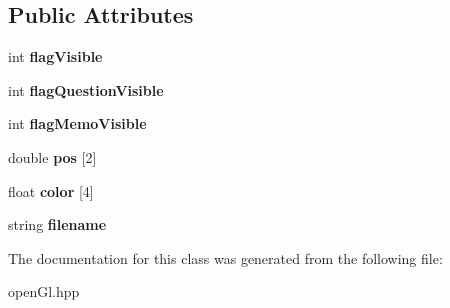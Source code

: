 \subsection*{Public Attributes}
\begin{DoxyCompactItemize}
\item 
\mbox{\label{classtableBergson_adaec1cc9fa66934fb753b73cf1cea6c8}} 
int {\bfseries flag\+Visible}
\item 
\mbox{\label{classtableBergson_a3de79075c33d5fdfada9f9d1ea7b42f7}} 
int {\bfseries flag\+Question\+Visible}
\item 
\mbox{\label{classtableBergson_afd6b8a993aceba9061b8acd499ee0c19}} 
int {\bfseries flag\+Memo\+Visible}
\item 
\mbox{\label{classtableBergson_ab0415c47c341dcaf315cc3d9c910304f}} 
double {\bfseries pos} \mbox{[}2\mbox{]}
\item 
\mbox{\label{classtableBergson_a855fb30d561c14e0043b82eb34378a39}} 
float {\bfseries color} \mbox{[}4\mbox{]}
\item 
\mbox{\label{classtableBergson_afcddc43fc5e2e77043f00cec9b61833c}} 
string {\bfseries filename}
\end{DoxyCompactItemize}


The documentation for this class was generated from the following file\+:\begin{DoxyCompactItemize}
\item 
open\+Gl.\+hpp\end{DoxyCompactItemize}
